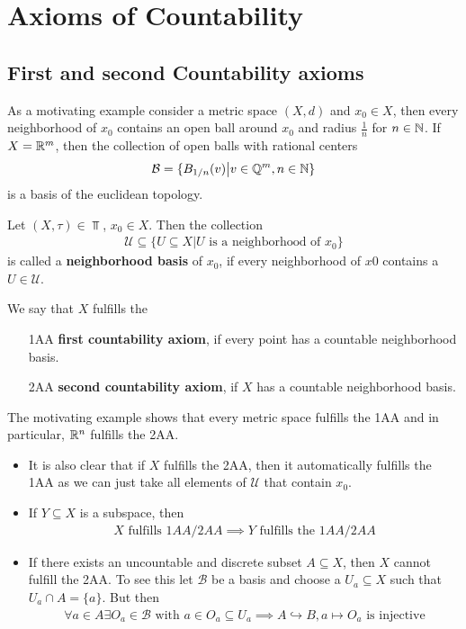 \section{Axioms of Countability}
\subsection{First and second Countability axioms}


As a motivating example consider a metric space $(X,d)$ and $x_0 \in X$, then every neighborhood of $x_0$ contains an open ball around $x_0$ and radius $\tfrac{1}{n}$ for $n \in \mathbb{N}$.
If $X = \mathbb{R}^{m}$, then the collection of open balls with rational centers
\begin{align*}
  \mathcal{B} = \{B_{1/n}(v) \big\vert v\in \mathbb{Q}^{m}, n \in \mathbb{N}\}
\end{align*}
is a basis of the euclidean topology.



\begin{dfn}[]
  Let $(X,\tau) \in \Top$, $x_0 \in X$. Then the collection
  \begin{align*}
    \mathcal{U} \subseteq \{U \subseteq X \big\vert U \text{ is a neighborhood of }x_0\}
  \end{align*}
  is called a \textbf{neighborhood basis} of $x_0$, if every neighborhood of $x0$ contains a $U \in \mathcal{U}$.

  We say that $X$ fulfills the 
  \begin{itemize}
    \item[1AA] \textbf{first countability axiom}, if every point has a countable neighborhood basis.
    \item[2AA] \textbf{second countability axiom}, if $X$ has a countable neighborhood basis.
  \end{itemize}
\end{dfn}

  The motivating example shows that every metric space fulfills the 1AA and in particular, $\mathbb{R}^{n}$ fulfills the 2AA.
\begin{itemize}
  \item It is also clear that if $X$ fulfills the 2AA, then it automatically fulfills the 1AA as we can just take all elements of $\mathcal{U}$ that contain $x_0$.
  \item If $Y \subseteq X$ is a subspace, then 
    \begin{align*}
      X \text{ fulfills } 1AA/2AA \implies Y \text{ fulfills the } 1AA/2AA
    \end{align*}
  \item If there exists an uncountable and discrete subset $A \subseteq X$, then $X$ cannot fulfill the 2AA.
    To see this let $\mathcal{B}$ be a basis and choose a $U_a \subseteq X$ such that $U_a \cap A = \{a\}$. But then
    \begin{align*}
      \forall a \in A \exists O_a \in \mathcal{B} \text{ with } a \in O_a \subseteq U_a \implies A \hookrightarrow B, a \mapsto O_a \text{ is injective}
    \end{align*}
\end{itemize}

